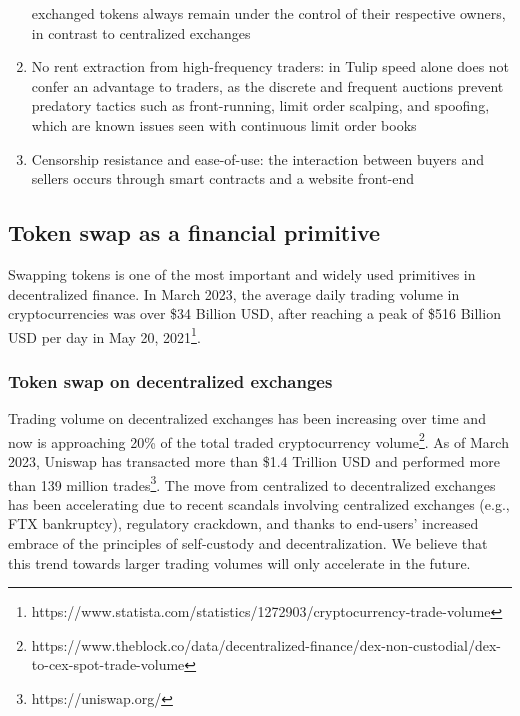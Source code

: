 \documentclass[11pt, reqno]{amsart}
\theoremstyle{definition}
\theoremstyle{remark}
\begin{document}
\begin{enumerate}
          exchanged tokens always remain under the control of their respective
          owners, in contrast to centralized exchanges
    \item No rent extraction from high-frequency traders:
          in Tulip speed alone does not confer an advantage to traders, as the
          discrete and frequent auctions prevent predatory tactics such as
          front-running, limit order scalping, and spoofing, which are known
          issues seen with continuous limit order books
    \item Censorship resistance and ease-of-use:
          the interaction between buyers and sellers occurs through smart
          contracts and a website front-end
\end{enumerate}


\subsection{Token swap as a financial primitive}
Swapping tokens is one of the most important and widely used primitives in
decentralized finance.
In March 2023, the average daily trading volume in cryptocurrencies was over
\$34 Billion USD, after reaching a peak of \$516 Billion USD per day in May 20,
2021\footnote{https://www.statista.com/statistics/1272903/cryptocurrency-trade-volume}.


\subsubsection{Token swap on decentralized exchanges}
Trading volume on decentralized exchanges has been increasing over time and now
is approaching 20\% of the total traded cryptocurrency
volume\footnote{https://www.theblock.co/data/decentralized-finance/dex-non-custodial/dex-to-cex-spot-trade-volume}.
As of March 2023, Uniswap has transacted more than \$1.4 Trillion USD and
performed more than 139 million trades\footnote{https://uniswap.org/}.
The move from centralized to decentralized exchanges has been accelerating due
to recent scandals involving centralized exchanges (e.g., FTX bankruptcy),
regulatory crackdown, and thanks to end-users' increased embrace of the
principles of self-custody and decentralization.
We believe that this trend towards larger trading volumes will only accelerate
in the future.
\end{document}
